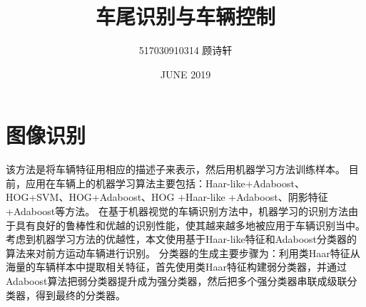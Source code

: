 \documentclass{article}
\title{车尾识别与车辆控制}
\author{517030910314 顾诗轩}
\date{JUNE 2019}
\begin{document}
\maketitle
\tableofcontents
\newpage
\section{图像识别}
该方法是将车辆特征用相应的描述子来表示，然后用机器学习方法训练样本。
\newline\newline
目前，应用在车辆上的机器学习算法主要包括：Haar-like+Adaboost、HOG+SVM、HOG+Adaboost、HOG +Haar-like +Adaboost、阴影特征+Adaboost等方法。
\newline\newline
在基于机器视觉的车辆识别方法中，机器学习的识别方法由于具有良好的鲁棒性和优越的识别性能，使其越来越多地被应用于车辆识别当中。考虑到机器学习方法的优越性，本文使用基于Haar-like特征和Adaboost分类器的算法来对前方运动车辆进行识别。
\newline\newline
分类器的生成主要步骤为：利用类Haar特征从海量的车辆样本中提取相关特征，首先使用类Haar特征构建弱分类器，并通过Adaboost算法把弱分类器提升成为强分类器，然后把多个强分类器串联成级联分类器，得到最终的分类器。
\end{document}
